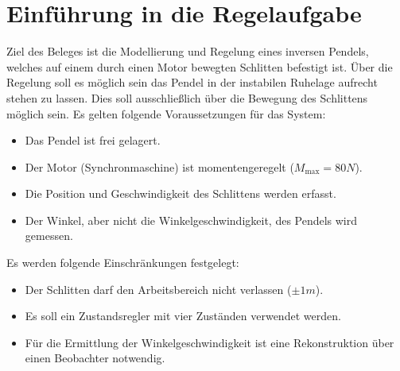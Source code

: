 \documentclass[
	pagesize,
	fontsize=12pt,
	paper=a4,
	oneside,
   reqno
]{scrartcl}
\begin{document}
\clearpage

\renewcommand{\contentsname}{Inhaltsverzeichnis}
\tableofcontents
\clearpage

\renewcommand{\listfigurename}{Abbildungsverzeichnis}
\renewcommand*{\figurename}{Abb.}
\listoffigures

\renewcommand*{\listtablename}{Tabellenverzeichnis}
\renewcommand*{\tablename}{Tab.}
\listoftables
\clearpage



\section{Einführung in die Regelaufgabe}

Ziel des Beleges ist die Modellierung und Regelung eines inversen Pendels, welches auf einem durch einen Motor bewegten Schlitten befestigt ist. Über die Regelung soll es möglich sein das Pendel in der instabilen Ruhelage aufrecht stehen zu lassen. Dies soll ausschließlich über die Bewegung des Schlittens möglich sein. Es gelten folgende Voraussetzungen für das System:

\begin{itemize}
    \item Das Pendel ist frei gelagert.
    \item Der Motor (Synchronmaschine) ist momentengeregelt ($M_{\mathrm{max}} = 80N$).
    \item Die Position und Geschwindigkeit des Schlittens werden erfasst.
    \item Der Winkel, aber nicht die Winkelgeschwindigkeit, des Pendels wird gemessen.
\end{itemize}

Es werden folgende Einschränkungen festgelegt:

\begin{itemize}
    \item Der Schlitten darf den Arbeitsbereich nicht verlassen ($\pm 1m$).
    \item Es soll ein Zustandsregler mit vier Zuständen verwendet werden.
    \item Für die Ermittlung der Winkelgeschwindigkeit ist eine Rekonstruktion über einen Beobachter notwendig.
\end{itemize}
\end{document}
